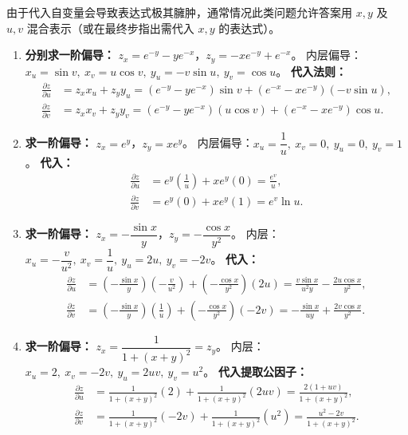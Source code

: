 \documentclass[lang=cn,11pt]{elegantbook}
\begin{document}
\begin{solution}
由于代入自变量会导致表达式极其臃肿，通常情况此类问题允许答案用 $x,y$ 及 $u,v$ 混合表示（或在最终步指出需代入 $x, y$ 的表达式）。
\begin{enumerate}
  \item[(1)] \textbf{分别求一阶偏导：} $z_x = e^{-y} - ye^{-x}$，$z_y = -xe^{-y} + e^{-x}$。
  内层偏导：$x_u = \sin v,\ x_v = u\cos v,\ y_u = -v\sin u,\ y_v = \cos u$。
  \textbf{代入法则：}
  \begin{align*}
  \frac{\partial z}{\partial u} &= z_x x_u + z_y y_u = (e^{-y} - ye^{-x})\sin v + (e^{-x} - xe^{-y})(-v\sin u), \\
  \frac{\partial z}{\partial v} &= z_x x_v + z_y y_v = (e^{-y} - ye^{-x})(u\cos v) + (e^{-x} - xe^{-y})\cos u.
  \end{align*}

  \item[(2)] \textbf{求一阶偏导：} $z_x = e^y$，$z_y = xe^y$。
  内层偏导：$x_u = \dfrac{1}{u},\ x_v = 0,\ y_u = 0,\ y_v = 1$。
  \textbf{代入：}
  \begin{align*}
  \frac{\partial z}{\partial u} &= e^y\left(\frac{1}{u}\right) + xe^y(0) = \frac{e^v}{u}, \\
  \frac{\partial z}{\partial v} &= e^y(0) + xe^y(1) = e^v\ln u.
  \end{align*}

  \item[(3)] \textbf{求一阶偏导：} $z_x = -\dfrac{\sin x}{y}$，$z_y = -\dfrac{\cos x}{y^2}$。
  内层：$x_u = -\dfrac{v}{u^2},\ x_v = \dfrac{1}{u},\ y_u = 2u,\ y_v = -2v$。
  \textbf{代入：}
  \begin{align*}
  \frac{\partial z}{\partial u} &= \left(-\frac{\sin x}{y}\right)\left(-\frac{v}{u^2}\right) + \left(-\frac{\cos x}{y^2}\right)(2u) = \frac{v\sin x}{u^2 y} - \frac{2u\cos x}{y^2}, \\
  \frac{\partial z}{\partial v} &= \left(-\frac{\sin x}{y}\right)\left(\frac{1}{u}\right) + \left(-\frac{\cos x}{y^2}\right)(-2v) = -\frac{\sin x}{uy} + \frac{2v\cos x}{y^2}.
  \end{align*}

  \item[(4)] \textbf{求一阶偏导：} $z_x = \dfrac{1}{1+(x+y)^2} = z_y$。
  内层：$x_u = 2,\ x_v = -2v,\ y_u = 2uv,\ y_v = u^2$。
  \textbf{代入提取公因子：}
  \begin{align*}
  \frac{\partial z}{\partial u} &= \frac{1}{1+(x+y)^2}(2) + \frac{1}{1+(x+y)^2}(2uv) = \frac{2(1+uv)}{1+(x+y)^2}, \\
  \frac{\partial z}{\partial v} &= \frac{1}{1+(x+y)^2}(-2v) + \frac{1}{1+(x+y)^2}(u^2) = \frac{u^2-2v}{1+(x+y)^2}.
  \end{align*}


\end{enumerate}
\end{solution}
\end{document}
